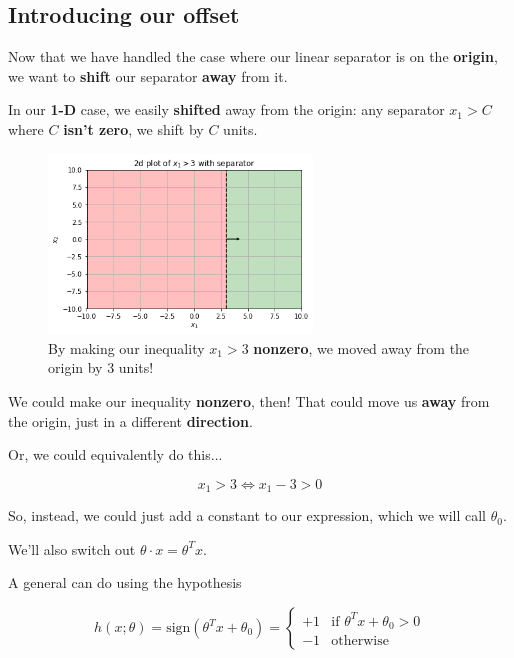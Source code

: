         
    \subsection*{Introducing our offset}
        
        Now that we have handled the case where our linear separator is on the \textbf{origin}, we want to \textbf{shift} our separator \textbf{away} from it.
        
        In our \textbf{1-D} case, we easily \textbf{shifted} away from the origin: any separator $x_1>C$ where $C$ \textbf{isn't zero}, we shift by $C$ units.
        
        \begin{figure}[H]
            \centering
                \includegraphics[width=70mm,scale=0.5]{images/classification_images/x1_2d_plot_separator.png}
                \caption*{By making our inequality $x_1>3$ \textbf{nonzero}, we moved away from the origin by 3 units!}
        \end{figure}
        
        We could make our inequality \textbf{nonzero}, then! That could move us \textbf{away} from the origin, just in a different \textbf{direction}.
        
        Or, we could equivalently do this...
        
        \begin{equation}
            x_1 >3 \Longleftrightarrow x_1-3 > 0
        \end{equation}
        
        So, instead, we could just add a constant to our expression, which we will call $\theta_0$.
        
        We'll also switch out $\theta \cdot x = \theta^T x$.\\
        
        \begin{kequation}
            A general  can do  using the hypothesis
            
            \begin{equation*}
                h(x; \theta) = \text{sign}(\theta^T x + \theta_0 )= 
                \begin{cases}
                    +1 & \text{if $\theta^T x + \theta_0 > 0$} \\
                    -1 & \text{otherwise}
                \end{cases}
            \end{equation*}
        \end{kequation}
        
